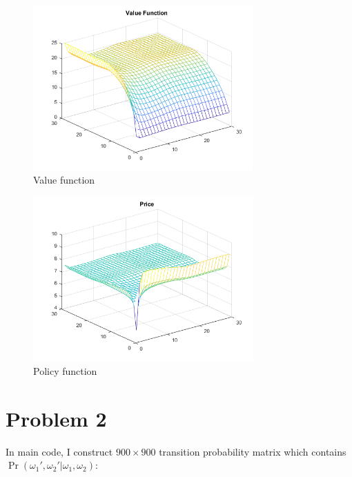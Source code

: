 \documentclass[11pt,letter]{article}
\newcounter{lem}[section] \setcounter{lem}{0}
\begin{document}
\begin{figure}[h]
\begin{center}
\caption{Value function}
\includegraphics[width=0.75\textwidth]{value.png}
\end{center}
\end{figure}

\begin{figure}[h]
\begin{center}
\caption{Policy function}
\includegraphics[width=0.75\textwidth]{price.png}
\end{center}
\end{figure}


\newpage
\section*{Problem 2}

In main code, I construct $900\times 900$ transition probability matrix which contains $\Pr(\omega_1',\omega_2' |\omega_1,\omega_2)$:
\end{document}
